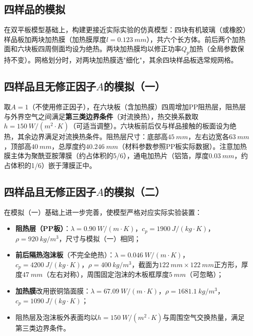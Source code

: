 \documentclass[a4paper,8pt,twocolumn]{article}
\begin{document}
\subsection{四样品的模拟}

在双平板模型基础上，构建更接近实际实验的仿真模型：四块有机玻璃（或橡胶）样品板加两块加热膜（加热膜厚度$l=\SI{0.123}{mm}$），共六个长方体。前后两个加热面和六块板四周侧面均设为绝热。两块加热膜均以修正功率$Q_p$加热（全局参数保持不变）。网格划分时，对两块加热膜选"细化"，其余四块样品板选常规网格。

\subsection{四样品且无修正因子$A$的模拟（一）}

取$A=1$（不使用修正因子），在六块板（含加热膜）四周增加PP阻热层，阻热层与外界空气之间满足\textbf{第三类边界条件}（对流换热），热交换系数取$h=\SI{150}{W/(m^2\cdot K)}$（可适当调整）。六块板前后仅与样品接触的板面设为绝热，其余边界满足对流换热条件。阻热层尺寸：底部高$\SI{45}{mm}$，左右边宽各$\SI{63}{mm}$，顶部高$\SI{40}{mm}$，总厚度约$\SI{40.246}{mm}$（材料参数参照PP板实际数据）。注意加热膜主体为聚酰亚胺薄膜（约占体积的5/6），通电加热片（铝箔，厚度$\SI{0.03}{mm}$，约占体积的1/6）嵌于薄膜正中。

\subsection{四样品且无修正因子$A$的模拟（二）}

在模拟（一）基础上进一步完善，使模型严格对应实际实验装置：

\begin{itemize}
  \item \textbf{阻热层（PP板）}：$\lambda=\SI{0.90}{W/(m\cdot K)}$，$c_p=\SI{1900}{J/(kg\cdot K)}$，$\rho=\SI{920}{kg/m^3}$，尺寸与模拟（一）相同；
  \item \textbf{前后隔热泡沫板}（不完全绝热）：$\lambda=\SI{0.046}{W/(m\cdot K)}$，$c_p=\SI{4200}{J/(kg\cdot K)}$，$\rho=\SI{400}{kg/m^3}$，截面为$\SI{122}{mm}\times\SI{122}{mm}$正方形，厚度$\SI{47}{mm}$（左右对称），周围固定泡沫的木板框厚度$\SI{5}{mm}$（可忽略）；
  \item \textbf{加热膜}改用嵌铜箔面膜：$\lambda=\SI{67.09}{W/(m\cdot K)}$，$\rho=\SI{1681.1}{kg/m^3}$，$c_p=\SI{1090}{J/(kg\cdot K)}$；
  \item 阻热层及泡沫板外表面均以$h=\SI{150}{W/(m^2\cdot K)}$与周围空气交换热量，满足第三类边界条件。
\end{itemize}
\end{document}
